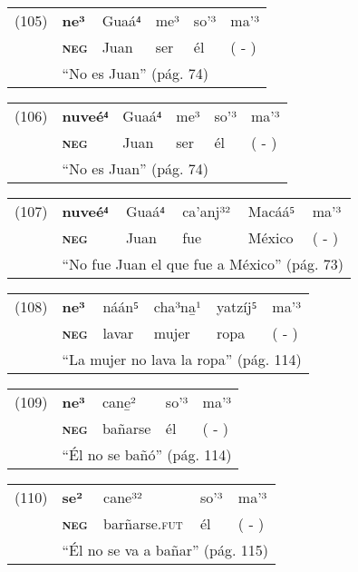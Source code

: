 {\setmainfont{Charis SIL} 

\begin{tabular}{llllll}
(105) & \textbf{ne³} & Guaá⁴ & me³ & so'³ & ma'³ \\
& \textsc{\textbf{neg}} & Juan & ser & él & ( - ) \\
& \multicolumn{5}{l}{``No es Juan'' (pág. 74)}
\end{tabular} \vspace{0.2cm}

\begin{tabular}{llllll}
(106) & \textbf{nuveé⁴} & Guaá⁴ & me³ & so'³ & ma'³ \\
& \textsc{\textbf{neg}} & Juan & ser & él & ( - ) \\
& \multicolumn{5}{l}{``No es Juan'' (pág. 74)}
\end{tabular} \vspace{0.2cm}

\begin{tabular}{llllll}
(107) & \textbf{nuveé⁴} & Guaá⁴ & ca'anj³² & Macáá⁵ & ma'³ \\
& \textsc{\textbf{neg}} & Juan & fue & México & ( - ) \\
& \multicolumn{5}{l}{``No fue Juan el que fue a México'' (pág. 73)} 
\end{tabular} \vspace{0.2cm}

\begin{tabular}{llllll}
(108) & \textbf{ne³} & náán⁵ & cha³na̱¹ & yatzíj⁵ & ma'³ \\
& \textsc{\textbf{neg}} & lavar & mujer &  ropa & ( - ) \\
& \multicolumn{5}{l}{``La mujer no lava la ropa'' (pág. 114)}
\end{tabular} \vspace{0.2cm}

\begin{tabular}{lllll}
(109) & \textbf{ne³} & cane̱² & so'³ & ma'³ \\
& \textsc{\textbf{neg}} & bañarse & él & ( - ) \\
& \multicolumn{4}{l}{``Él no se bañó'' (pág. 114)}
\end{tabular} \vspace{0.2cm}

\begin{tabular}{lllll}
(110) & \textbf{se²} & cane³² & so'³ & ma'³ \\
& \textsc{\textbf{neg}} & barñarse.\textsc{fut} & él & ( - ) \\
& \multicolumn{4}{l}{``Él no se va a bañar'' (pág. 115)}
\end{tabular} \vspace{0.3cm}

}

